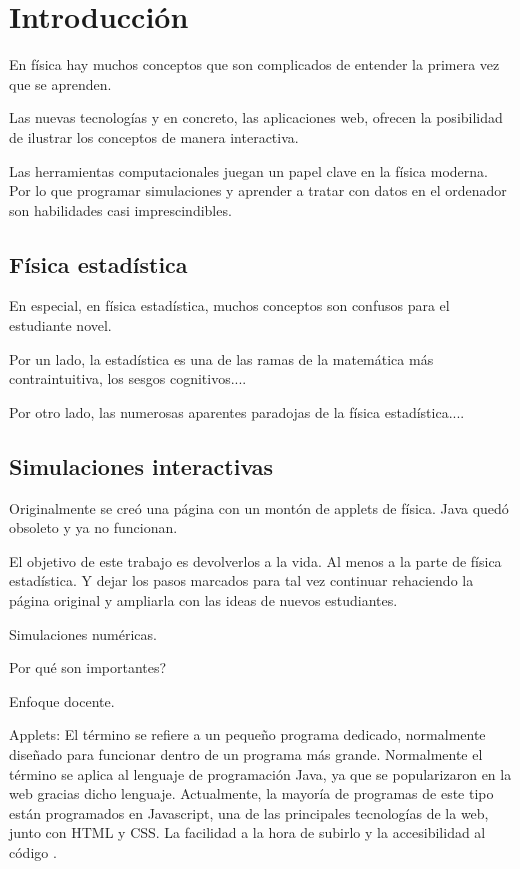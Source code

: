 \documentclass[11pt, a4paper]{article} %
\theoremstyle{named}
\begin{document}
\tableofcontents

\newpage
\section{Introducción}
\label{sec:intro}

    En física hay muchos conceptos que son complicados de entender la primera vez que se aprenden.

    Las nuevas tecnologías y en concreto, las aplicaciones web, ofrecen la posibilidad de ilustrar los conceptos de manera interactiva.

    Las herramientas computacionales juegan un papel clave en la física moderna. Por lo que programar simulaciones y aprender a tratar con datos en el ordenador son habilidades casi imprescindibles.

    \subsection{Física estadística}\label{sec:fises}

        En especial, en física estadística, muchos conceptos son confusos para el estudiante novel.

        Por un lado, la estadística es una de las ramas de la matemática más contraintuitiva, los sesgos cognitivos....

        Por otro lado, las numerosas aparentes paradojas de la física estadística....

    \subsection{Simulaciones interactivas}
    \label{sec:sims}

        Originalmente se creó una página con un montón de applets de física. Java quedó obsoleto y ya no funcionan.

        El objetivo de este trabajo es devolverlos a la vida. Al menos a la parte de física estadística. Y dejar los pasos marcados para tal vez continuar rehaciendo la página original y ampliarla con las ideas de nuevos estudiantes.

        Simulaciones numéricas.

        Por qué son importantes?

        Enfoque docente.

        Applets: El término se refiere a un pequeño programa dedicado, normalmente diseñado para funcionar dentro de un programa más grande. Normalmente el término se aplica al lenguaje de programación Java, ya que se popularizaron en la web gracias dicho lenguaje.  Actualmente, la mayoría de programas de este tipo están programados en Javascript, una de las principales tecnologías de la web, junto con HTML y CSS. La facilidad a la hora de subirlo y la accesibilidad al código \cite{schroeder}.
\end{document}
